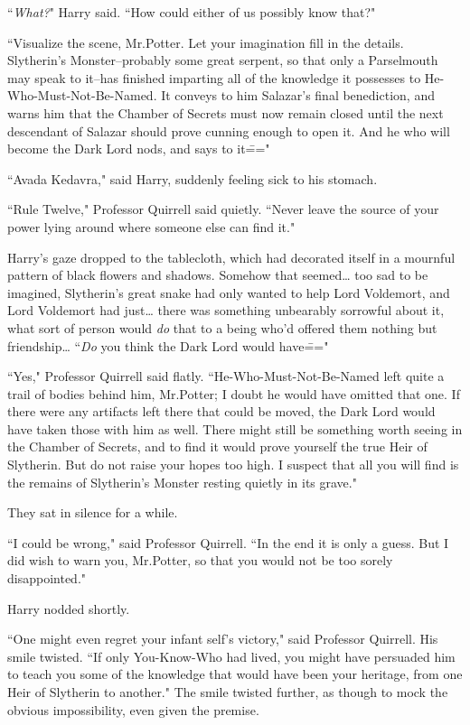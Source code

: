 ``\emph{What?}" Harry said. ``How could either of us possibly know that?"

``Visualize the scene, Mr.\?Potter. Let your imagination fill in the details. Slytherin's Monster\---probably some great serpent, so that only a Parselmouth may speak to it\---has finished imparting all of the knowledge it possesses to He-Who-Must-Not-Be-Named. It conveys to him Salazar's final benediction, and warns him that the Chamber of Secrets must now remain closed until the next descendant of Salazar should prove cunning enough to open it. And he who will become the Dark Lord nods, and says to it\==="

``Avada Kedavra," said Harry, suddenly feeling sick to his stomach.

``Rule Twelve," Professor Quirrell said quietly. ``Never leave the source of your power lying around where someone else can find it."

Harry's gaze dropped to the tablecloth, which had decorated itself in a mournful pattern of black flowers and shadows. Somehow that seemed{\ldots} too sad to be imagined, Slytherin's great snake had only wanted to help Lord Voldemort, and Lord Voldemort had just{\ldots} there was something unbearably sorrowful about it, what sort of person would \emph{do} that to a being who'd offered them nothing but friendship{\ldots} ``\emph{Do} you think the Dark Lord would have\==="

``Yes," Professor Quirrell said flatly. ``He-Who-Must-Not-Be-Named left quite a trail of bodies behind him, Mr.\?Potter; I doubt he would have omitted that one. If there were any artifacts left there that could be moved, the Dark Lord would have taken those with him as well. There might still be something worth seeing in the Chamber of Secrets, and to find it would prove yourself the true Heir of Slytherin. But do not raise your hopes too high. I suspect that all you will find is the remains of Slytherin's Monster resting quietly in its grave."

They sat in silence for a while.

``I could be wrong," said Professor Quirrell. ``In the end it is only a guess. But I did wish to warn you, Mr.\?Potter, so that you would not be too sorely disappointed."

Harry nodded shortly.

``One might even regret your infant self's victory," said Professor Quirrell. His smile twisted. ``If only You-Know-Who had lived, you might have persuaded him to teach you some of the knowledge that would have been your heritage, from one Heir of Slytherin to another." The smile twisted further, as though to mock the obvious impossibility, even given the premise.

